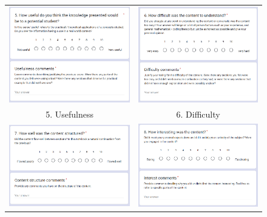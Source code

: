 \begin{appendices}
\begin{figure}[H]
\centering
\begin{tabular}{cc}
\includegraphics[width=76mm]{images/questionnaire/q5} &   \includegraphics[width=76mm]{images/questionnaire/q6} \\
5. Usefulness & 6. Difficulty \\[6pt]
\includegraphics[width=76mm]{images/questionnaire/q7} &   \includegraphics[width=76mm]{images/questionnaire/q8} \\

\end{tabular}
\end{figure}
\end{appendices}
